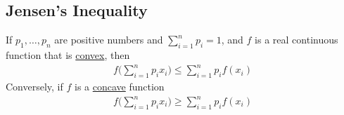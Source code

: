 \subsection*{Jensen's Inequality}
If $p_1, \ldots, p_n$ are positive numbers and $\sum_{i=1}^n p_i = 1$, and $f$ is a real continuous function that is \underline{convex}, then
\begin{gather*}
	f\bigg(\sum\limits_{i=1}^n p_i x_i \bigg)\leq \sum\limits_{i=1}^n p_i f(x_i)
\end{gather*}
Conversely, if $f$ is a \underline{concave} function
\begin{gather*}
	f\bigg(\sum\limits_{i=1}^n p_i x_i \bigg) \geq \sum\limits_{i=1}^n p_i f(x_i)
\end{gather*}